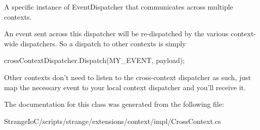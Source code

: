 A specific instance of Event\-Dispatcher that communicates across multiple contexts. 

An event sent across this dispatcher will be re-\/dispatched by the various context-\/wide dispatchers. So a dispatch to other contexts is simply

{\ttfamily cross\-Context\-Dispatcher.\-Dispatch(\-M\-Y\-\_\-\-E\-V\-E\-N\-T, payload)};

Other contexts don't need to listen to the cross-\/context dispatcher as such, just map the necessary event to your local context dispatcher and you'll receive it. 

The documentation for this class was generated from the following file\-:\begin{DoxyCompactItemize}
\item 
Strange\-Io\-C/scripts/strange/extensions/context/impl/Cross\-Context.\-cs\end{DoxyCompactItemize}
